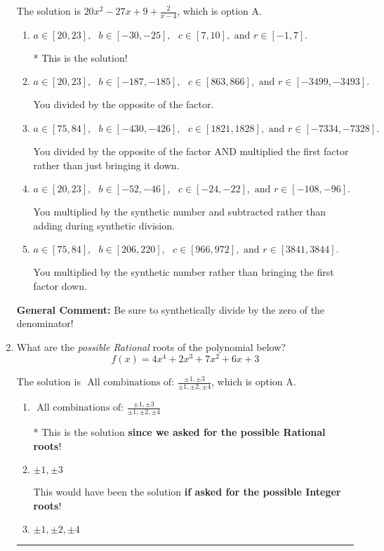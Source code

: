 \documentclass{extbook}[14pt]
\newcommand{\litem}[1]{\item #1

\rule{\textwidth}{0.4pt}}
\begin{document}
\begin{enumerate}
{The solution is \( 20x^{2} -27 x + 9 + \frac{2}{x -4} \), which is option A.\begin{enumerate}[label=\Alph*.]
\item \( a \in [20, 23], \text{   } b \in [-30, -25], \text{   } c \in [7, 10], \text{   and   } r \in [-1, 7]. \)

* This is the solution!
\item \( a \in [20, 23], \text{   } b \in [-187, -185], \text{   } c \in [863, 866], \text{   and   } r \in [-3499, -3493]. \)

 You divided by the opposite of the factor.
\item \( a \in [75, 84], \text{   } b \in [-430, -426], \text{   } c \in [1821, 1828], \text{   and   } r \in [-7334, -7328]. \)

 You divided by the opposite of the factor AND multiplied the first factor rather than just bringing it down.
\item \( a \in [20, 23], \text{   } b \in [-52, -46], \text{   } c \in [-24, -22], \text{   and   } r \in [-108, -96]. \)

 You multiplied by the synthetic number and subtracted rather than adding during synthetic division.
\item \( a \in [75, 84], \text{   } b \in [206, 220], \text{   } c \in [966, 972], \text{   and   } r \in [3841, 3844]. \)

 You multiplied by the synthetic number rather than bringing the first factor down.
\end{enumerate}

\textbf{General Comment:} Be sure to synthetically divide by the zero of the denominator!
}
\litem{
What are the \textit{possible Rational} roots of the polynomial below?
\[ f(x) = 4x^{4} +2 x^{3} +7 x^{2} +6 x + 3 \]

The solution is \( \text{ All combinations of: }\frac{\pm 1,\pm 3}{\pm 1,\pm 2,\pm 4} \), which is option A.\begin{enumerate}[label=\Alph*.]
\item \( \text{ All combinations of: }\frac{\pm 1,\pm 3}{\pm 1,\pm 2,\pm 4} \)

* This is the solution \textbf{since we asked for the possible Rational roots}!
\item \( \pm 1,\pm 3 \)

This would have been the solution \textbf{if asked for the possible Integer roots}!
\item \( \pm 1,\pm 2,\pm 4 \)


\end{enumerate}}
\end{enumerate}
\end{document}
